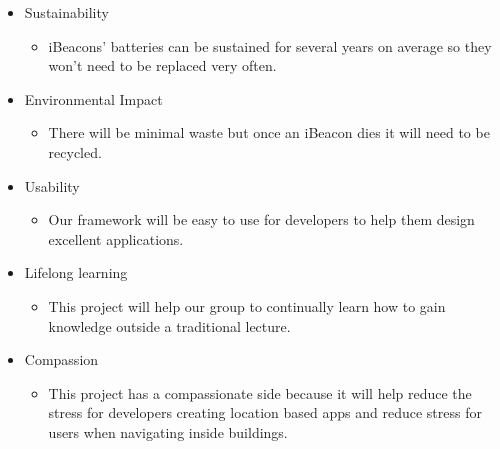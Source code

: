 \begin{itemize}
\begin{itemize}
\end{itemize}
\item Sustainability
\begin{itemize}
\item iBeacons' batteries can be sustained for several years on average so they won't need to be replaced very often.
\end{itemize}
\item Environmental Impact
\begin{itemize}
\item There will be minimal waste but once an iBeacon dies it will need to be recycled.
\end{itemize}
\item Usability
\begin{itemize}
\item Our framework will be easy to use for developers to help them design excellent applications.
\end{itemize}
\item Lifelong learning
\begin{itemize}
\item This project will help our group to continually learn how to gain knowledge outside a traditional lecture.
\end{itemize}
\item Compassion
\begin{itemize}
\item This project has a compassionate side because it will help reduce the stress for developers creating location based apps and reduce stress for users when navigating inside buildings.
\end{itemize}
\end{itemize}
